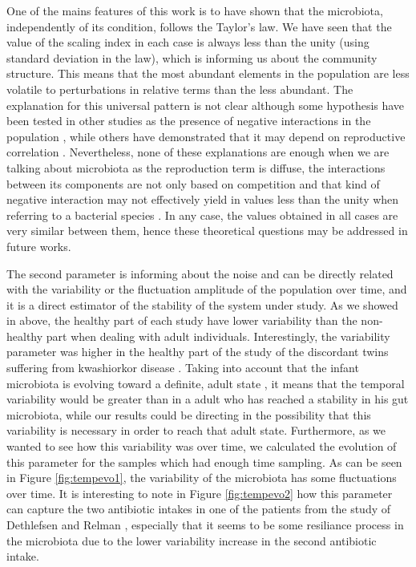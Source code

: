 One of the mains features of this work is to have shown that the microbiota, independently of its condition, follows the Taylor's law. We have seen that the value of the scaling index in each case is always less than the unity (using standard deviation in the law), which is informing us about the community structure. This means that the most abundant elements in the population are less volatile to perturbations in relative terms than the less abundant. The explanation for this universal pattern is not clear although some hypothesis have been tested in other studies as the presence of negative interactions in the population \cite{kilpatrick}, while others have demonstrated that it may depend on reproductive correlation \cite{ballantyne}. Nevertheless, none of these explanations are enough when we are talking about microbiota as the reproduction term is diffuse, the interactions between its components are not only based on competition \cite{joao, mehta, bucci} and that kind of negative interaction may not effectively yield in values less than the unity when referring to a bacterial species \cite{ramslayer}. In any case, the values obtained in all cases are very similar between them, hence these theoretical questions may be addressed in future works.

The second parameter is informing about the noise and can be directly related with the variability or the fluctuation amplitude of the population over time, and it is a direct estimator of the stability of the system under study. As we showed in above, the healthy part of each study have lower variability than the non-healthy part when dealing with adult individuals. Interestingly, the variability parameter was higher in the healthy part of the study of the discordant twins suffering from kwashiorkor disease \cite{kwashiorkor}. Taking into account that the infant microbiota is evolving toward a definite, adult state \cite{koenig}, it means that the temporal variability would be greater than in a adult who has reached a stability in his gut microbiota, while our results could be directing in the possibility that this variability is necessary in order to reach that adult state. Furthermore, as we wanted to see how this variability was over time, we calculated the evolution of this parameter for the samples which had enough time sampling. As can be seen in Figure \ref{fig:tempevo1}, the variability of the microbiota has some fluctuations over time. It is interesting to note in Figure \ref{fig:tempevo2} how this parameter can capture the two antibiotic intakes in one of the patients from the study of Dethlefsen and Relman \cite{antibiotic}, especially that it seems to be some resiliance process in the microbiota due to the lower variability increase in the second antibiotic intake.  

